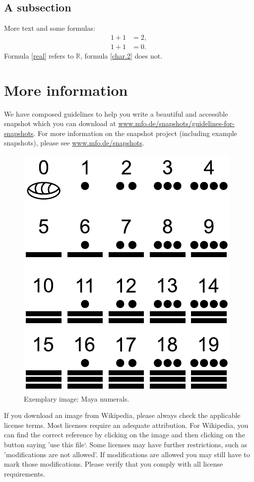 \documentclass{snapshotmfo}
\begin{document}
\subsection{A subsection}
More text and some formulas:
\begin{align}\label{real}
1+1&=2,\\\label{char.2}
1+1&=0.
\end{align}
Formula \eqref{real} refers to $\mathbb{R}$, formula \eqref{char.2} does not.

\section{More information}
We have composed guidelines to help you write a beautiful and accessible snapshot which you can download at \href{http://www.mfo.de/snapshots/guidelines-for-snapshots}{www.mfo.de/snapshots/guidelines-for-snapshots}. For more information on the snapshot project (including example snapshots), please see \href{http://www.mfo.de/snapshots}{www.mfo.de/snapshots}.


\begin{figure}[ht]
        \centering 
        \includegraphics[width= 0.33 \textwidth]{maya.pdf}
        \caption{Exemplary image: Maya numerals.}
\label{fig:maya}
\end{figure}

If you download an image from Wikipedia, please always check the applicable license terms. Most licenses require an adequate attribution. For Wikipedia, you can find the correct reference by clicking on the image and then clicking on the button saying 'use this file‘. Some licenses may have further restrictions, such as 'modifications are not allowed'. If modifications are allowed you may still have to mark those modifications. Please verify that you comply with all license requirements.
\end{document}
